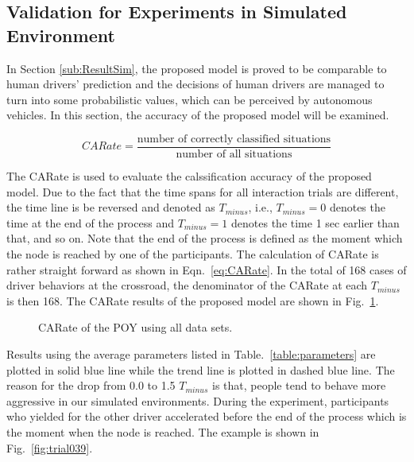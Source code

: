 \newpage

\subsection{Validation for Experiments in Simulated Environment}
\label{sub:ValidationSim}


In Section \ref{sub:ResultSim}, the proposed model is proved to be comparable to human drivers' prediction and the decisions of human drivers are managed to turn into some probabilistic values, which can be perceived by autonomous vehicles. In this section, the accuracy of the proposed model will be examined.

\begin{equation}
    CARate = \frac{\text{number of correctly classified situations}}{\text{number of all situations}}
\label{eq:CARate}
\end{equation}

The \ac{CARate} is used to evaluate the calssification accuracy of the proposed model. Due to the fact that the time spans for all interaction trials are different, the time line is be reversed and denoted as $T_{minus}$, i.e., $T_{minus}=0$ denotes the time at the end of the process and $T_{minus}=1$ denotes the time 1 sec earlier than that, and so on. Note that the end of the process is defined as the moment which the node is reached by one of the participants. The calculation of CARate is rather straight forward as shown in Eqn.~\ref{eq:CARate}. In the total of 168 cases of driver behaviors at the crossroad, the denominator of the CARate at each $T_{minus}$ is then 168. The CARate results of the proposed model are shown in Fig.~\ref{fig:CARPOY}.

\begin{figure}[htbp!]
\begin{center}
\end{center}
\caption{CARate of the POY using all data sets.}
\label{fig:CARPOY} 
\end{figure}

Results using the average parameters listed in Table.~\ref{table:parameters} are plotted in solid blue line while the trend line is plotted in dashed blue line. The reason for the drop from 0.0 to 1.5 $T_{minus}$ is that, people tend to behave more aggressive in our simulated environments. During the experiment, participants who yielded for the other driver accelerated before the end of the process which is the moment when the node is reached. The example is shown in Fig.~\ref{fig:trial039}.

